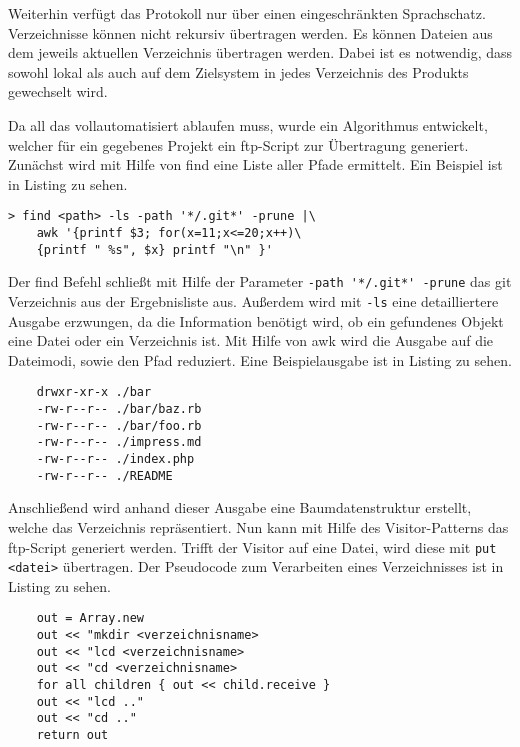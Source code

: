 Weiterhin verfügt das Protokoll nur über einen eingeschränkten Sprachschatz. Verzeichnisse können nicht rekursiv übertragen werden. Es können Dateien aus dem jeweils aktuellen Verzeichnis übertragen werden. Dabei ist es notwendig, dass sowohl lokal als auch auf dem Zielsystem in jedes Verzeichnis des Produkts gewechselt wird.

Da all das vollautomatisiert ablaufen muss, wurde ein Algorithmus entwickelt, welcher für ein gegebenes Projekt ein \gls{ftp}-Script zur Übertragung generiert. Zunächst wird mit Hilfe von find eine Liste aller Pfade ermittelt. Ein Beispiel ist in Listing  zu sehen.

\begin{lstlisting}
> find <path> -ls -path '*/.git*' -prune |\
	awk '{printf $3; for(x=11;x<=20;x++)\
	{printf " %s", $x} printf "\n" }'
\end{lstlisting}

Der find Befehl schließt mit Hilfe der Parameter \lstinline!-path '*/.git*' -prune! das git Verzeichnis aus der Ergebnisliste aus. Außerdem wird mit \lstinline!-ls! eine detailliertere Ausgabe erzwungen, da die Information benötigt wird, ob ein gefundenes Objekt eine Datei oder ein Verzeichnis ist. Mit Hilfe von awk wird die Ausgabe auf die Dateimodi, sowie den Pfad reduziert. Eine Beispielausgabe ist in Listing  zu sehen.

\begin{lstlisting}
	drwxr-xr-x ./bar
	-rw-r--r-- ./bar/baz.rb
	-rw-r--r-- ./bar/foo.rb
	-rw-r--r-- ./impress.md
	-rw-r--r-- ./index.php
	-rw-r--r-- ./README
\end{lstlisting}
     
Anschließend wird anhand dieser Ausgabe eine Baumdatenstruktur erstellt, welche das Verzeichnis repräsentiert. Nun kann mit Hilfe des Visitor-Patterns das \gls{ftp}-Script generiert werden. Trifft der Visitor auf eine Datei, wird diese mit \lstinline!put <datei>! übertragen. Der Pseudocode zum Verarbeiten eines Verzeichnisses ist in Listing  zu sehen.

\begin{lstlisting}
	out = Array.new
	out << "mkdir <verzeichnisname>
	out << "lcd <verzeichnisname>
	out << "cd <verzeichnisname>
	for all children { out << child.receive }
	out << "lcd .."
	out << "cd .."
	return out
\end{lstlisting}

